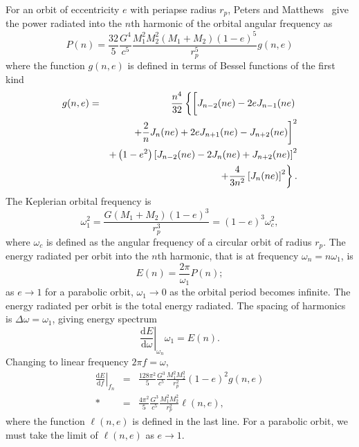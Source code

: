 \documentclass[aps,prd,amsfonts,amssymb,amsmath,nofootinbib,floatfix,reprint,showpacs,groupedaddress]{revtex4-1}
\newcommand{\dd}{\ensuremath{\mathrm{d}}}
\newcommand{\diff}[2]{\ensuremath{\frac{\dd {#1}}{\dd {#2}}}}
\begin{document}
For an orbit of eccentricity $e$ with periapse radius $r_{p}$, Peters and Matthews~\cite{Peters1963} give the power radiated into the $n$th harmonic of the orbital angular frequency as
\begin{equation}
P(n) = \frac{32}{5}\frac{G^4}{c^5}\frac{M_1^2M_2^2(M_1 + M_2)(1-e)^5}{r_{p}^5}g(n,e)
\label{eq:PM_P}
\end{equation}
where the function $g(n,e)$ is defined in terms of Bessel functions of the first kind
\begin{eqnarray}
g(n,e) & = & \frac{n^4}{32}\left\{\left[J_{n-2}(ne) - 2eJ_{n-1}(ne) \vphantom{\frac{2}{n}J_n(ne)} \right. \right. \nonumber \\*
 & & \left. + \frac{2}{n}J_n(ne) + 2eJ_{n+1}(ne) - J_{n+2}(ne)\right]^2 \nonumber \\*
 & & + \left(1 - e^2\right)\left[J_{n-2}(ne) - 2J_n(ne) + J_{n+2}(ne)\right]^2 \nonumber \\*
 & & \left. + \frac{4}{3n^2}\left[J_n(ne)\right]^2\right\}.
\end{eqnarray}
The Keplerian orbital frequency is
\begin{equation}
\omega_1^2 = \frac{G(M_1 + M_2)(1 - e)^3}{r_{p}^3} = (1 - e)^3\omega_{c}^2,
\label{eq:Kepler_freq}
\end{equation}
where $\omega_{c}$ is defined as the angular frequency of a circular orbit of radius $r_{p}$. The energy radiated per orbit into the $n$th harmonic, that is at frequency $\omega_n = n\omega_1$, is
\begin{equation}
E(n) = \frac{2\pi}{\omega_1}P(n);
\label{eq:E(n)}
\end{equation}
as $e \rightarrow 1$ for a parabolic orbit, $\omega_1 \rightarrow 0$ as the orbital period becomes infinite. The energy radiated per orbit is the total energy radiated. The spacing of harmonics is $\Delta\omega = \omega_1$, giving energy spectrum
\begin{equation}
\left.\diff{E}{\omega}\right|_{\omega_n}\omega_1 = E(n).
\end{equation}
Changing to linear frequency $2\pi f = \omega$,
\begin{eqnarray}
\left.\diff{E}{f}\right|_{f_n} & = & \frac{128\pi^2}{5}\frac{G^3}{c^5}\frac{M_1^2M_2^2}{r_{p}^2}(1-e)^2g(n,e) \\*
 & = & \frac{4\pi^2}{5}\frac{G^3}{c^5}\frac{M_1^2M_2^2}{r_{p}^2}\ell(n,e),
\label{eq:PM_spectrum}
\end{eqnarray}
where the function $\ell(n,e)$ is defined in the last line. For a parabolic orbit, we must take the limit of $\ell(n,e)$ as $e \rightarrow 1$.
\end{document}

